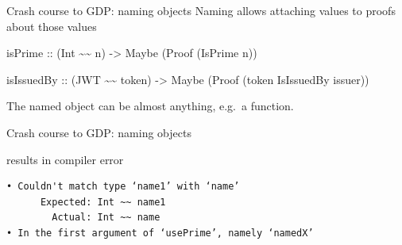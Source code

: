 \documentclass[
  9pt,
  ignorenonframetext,
]{beamer}
\newenvironment{Shaded}{}{}
\newcommand{\DataTypeTok}[1]{\textcolor[rgb]{0.56,0.13,0.00}{#1}}
\newcommand{\DecValTok}[1]{\textcolor[rgb]{0.25,0.63,0.44}{#1}}
\newcommand{\KeywordTok}[1]{\textcolor[rgb]{0.00,0.44,0.13}{\textbf{#1}}}
\newcommand{\NormalTok}[1]{#1}
\newcommand{\OperatorTok}[1]{\textcolor[rgb]{0.40,0.40,0.40}{#1}}
\newcommand{\OtherTok}[1]{\textcolor[rgb]{0.00,0.44,0.13}{#1}}
\begin{document}
\begin{frame}[fragile]{Crash course to GDP: naming objects}
\protect\hypertarget{crash-course-to-gdp-naming-objects-3}{}
Naming allows attaching values to proofs about those values

\begin{Shaded}
\begin{Highlighting}[]
\NormalTok{isPrime }
\OtherTok{  ::}\NormalTok{ (}\DataTypeTok{Int} \OperatorTok{\textasciitilde{}\textasciitilde{}}\NormalTok{ n) }
  \OtherTok{{-}\textgreater{}} \DataTypeTok{Maybe}\NormalTok{ (}\DataTypeTok{Proof}\NormalTok{ (}\DataTypeTok{IsPrime}\NormalTok{ n))}

\NormalTok{isIssuedBy }
\OtherTok{  ::}\NormalTok{ (}\DataTypeTok{JWT} \OperatorTok{\textasciitilde{}\textasciitilde{}}\NormalTok{ token) }
  \OtherTok{{-}\textgreater{}} \DataTypeTok{Maybe}\NormalTok{ (}\DataTypeTok{Proof}\NormalTok{ (token }\OtherTok{\textasciigrave{}IsIssuedBy\textasciigrave{}}\NormalTok{ issuer))}
\end{Highlighting}
\end{Shaded}

The named object can be almost anything, e.g.~a function.


\end{frame}

\begin{frame}[fragile]{Crash course to GDP: naming objects}
\protect\hypertarget{crash-course-to-gdp-naming-objects-4}{}
\begin{Shaded}
\end{Shaded}

results in compiler error

\begin{verbatim}
• Couldn't match type ‘name1’ with ‘name’
      Expected: Int ~~ name1
        Actual: Int ~~ name
• In the first argument of ‘usePrime’, namely ‘namedX’
\end{verbatim}



\end{frame}
\end{document}

